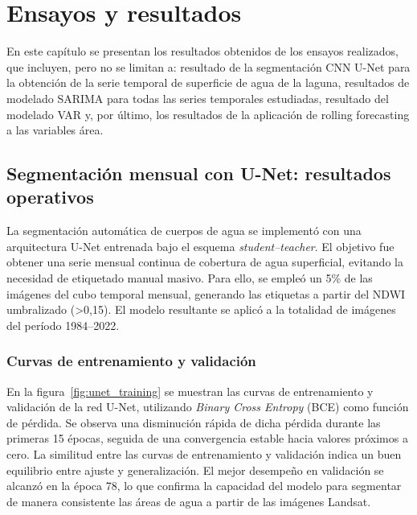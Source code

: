 
\chapter{Ensayos y resultados} %

\label{Chapter4} %
En este capítulo se presentan los resultados obtenidos de los ensayos realizados, que incluyen, pero no se limitan a: resultado de la segmentación CNN U-Net para la obtención de la serie temporal de superficie de agua de la laguna, resultados de modelado SARIMA para todas las series temporales estudiadas, resultado del modelado VAR y, por último, los resultados de la aplicación de rolling forecasting a las variables área. 


\section{Segmentación mensual con U-Net: resultados operativos}

La segmentación automática de cuerpos de agua se implementó con una arquitectura U-Net entrenada bajo el esquema \textit{student–teacher}. El objetivo fue obtener una serie mensual continua de cobertura de agua superficial, evitando la necesidad de etiquetado manual masivo. Para ello, se empleó un 5\% de las imágenes del cubo temporal mensual, generando las etiquetas a partir del NDWI umbralizado (>0,15). El modelo resultante se aplicó a la totalidad de imágenes del período 1984–2022.

\subsection{Curvas de entrenamiento y validación}
En la figura~\ref{fig:unet_training} se muestran las curvas de entrenamiento y validación de la red U-Net, utilizando \textit{Binary Cross Entropy} (BCE) como función de pérdida. Se observa una disminución rápida de dicha pérdida durante las primeras 15 épocas, seguida de una convergencia estable hacia valores próximos a cero. La similitud entre las curvas de entrenamiento y validación indica un buen equilibrio entre ajuste y generalización. El mejor desempeño en validación se alcanzó en la época 78, lo que confirma la capacidad del modelo para segmentar de manera consistente las áreas de agua a partir de las imágenes Landsat.

